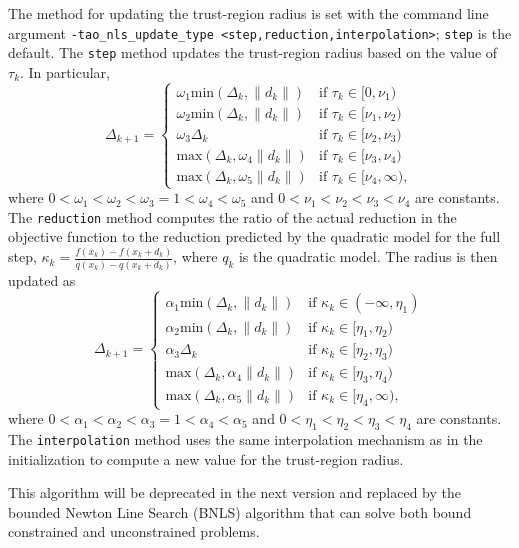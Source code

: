 The method for updating the trust-region radius is set with the 
command line argument 
{\tt -tao\_nls\_update\_type <step,reduction,interpolation>}; {\tt step} 
is the default.  The {\tt step} method updates the trust-region 
radius based on the value of $\tau_k$.  In particular,
\[
\Delta_{k+1} = \left\{\begin{array}{ll}
\omega_1 \mbox{min}(\Delta_k, \|d_k\|) & \mbox{if } \tau_k \in [0, \nu_1) \\
\omega_2 \mbox{min}(\Delta_k, \|d_k\|) & \mbox{if } \tau_k \in [\nu_1, \nu_2) \\
\omega_3 \Delta_k & \mbox{if } \tau_k \in [\nu_2, \nu_3) \\
\mbox{max}(\Delta_k, \omega_4 \|d_k\|) & \mbox{if } \tau_k \in [\nu_3, \nu_4) \\
\mbox{max}(\Delta_k, \omega_5 \|d_k\|) & \mbox{if } \tau_k \in [\nu_4, \infty),
\end{array}
\right.
\]
where $0 < \omega_1 < \omega_2 < \omega_3 = 1 < \omega_4 < \omega_5$ and
$0 < \nu_1 < \nu_2 < \nu_3 < \nu_4$ are constants.  The {\tt reduction} 
method computes the ratio of the actual reduction in the objective function 
to the reduction predicted by the quadratic model for the full step, 
$\kappa_k = \frac{f(x_k) - f(x_k + d_k)}{q(x_k) - q(x_k + d_k)}$, where 
$q_k$ is the quadratic model.  The radius is then updated as
\[
\Delta_{k+1} = \left\{\begin{array}{ll}
\alpha_1 \mbox{min}(\Delta_k, \|d_k\|) & \mbox{if } \kappa_k \in (-\infty, \eta_1) \\
\alpha_2 \mbox{min}(\Delta_k, \|d_k\|) & \mbox{if } \kappa_k \in [\eta_1, \eta_2) \\
\alpha_3 \Delta_k & \mbox{if } \kappa_k \in [\eta_2, \eta_3) \\
\mbox{max}(\Delta_k, \alpha_4 \|d_k\|) & \mbox{if } \kappa_k \in [\eta_3, \eta_4) \\
\mbox{max}(\Delta_k, \alpha_5 \|d_k\|) & \mbox{if } \kappa_k \in [\eta_4, \infty),
\end{array}
\right.
\]
where $0 < \alpha_1 < \alpha_2 < \alpha_3 = 1 < \alpha_4 < \alpha_5$ and
$0 < \eta_1 < \eta_2 < \eta_3 < \eta_4$ are constants.  The {\tt interpolation}
method uses the same interpolation mechanism as in the initialization to
compute a new value for the trust-region radius.

This algorithm will be deprecated in the next version and replaced by the 
bounded Newton Line Search (BNLS) algorithm that can solve both bound constrained 
and unconstrained problems.

